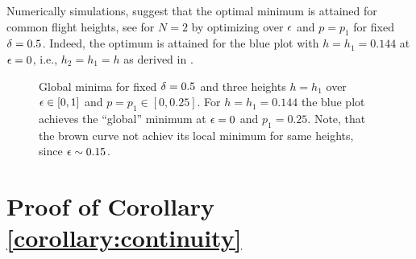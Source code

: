 \documentclass[smallabstract,smallcaptions]{dccpaper}
\newcommand{\junstart}{\color{black}}
\begin{document}
\fi



Numerically simulations, suggest that the optimal minimum is attained for common flight heights, see
 for $N=2$ by optimizing over $\epsilon$ and $p=p_1$ for fixed $\delta=0.5$.
Indeed, the optimum is attained for the blue plot with $h=h_1=0.144$ at $\epsilon=0$, i.e., $h_2=h_1=h$ as derived in
. 

\begin{figure}[t]
  \centering
{}
 \caption{Global minima for fixed $\delta=0.5$ and three heights $h=h_1$  over  $\epsilon\in[0,1]$ and $p=p_1\in[0,0.25]$.
   For $h=h_1=0.144$ the blue plot achieves the ``global'' minimum at $\epsilon=0$ and $p_1=0.25$. Note, that the brown curve
 not achiev its local minimum for same heights, since $\epsilon\sim0.15$.}\label{fig:globalnum_fixheight}
\end{figure}


\fi

\color{black}

%
%

\appendix

\junstart \section{Proof of Corollary \ref{corollary:continuity}}\label{proof:continuity} 
\end{document}
